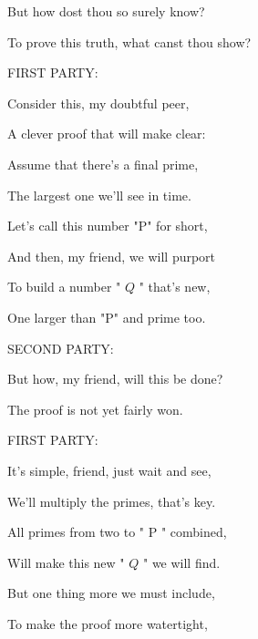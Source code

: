 \documentclass[10pt]{report}
\begin{document}
\hspace*{1em} But how dost thou so surely know?

\hspace*{1em} To prove this truth, what canst thou show?

\hspace*{1em} FIRST PARTY:

\hspace*{1em} Consider this, my doubtful peer,

\hspace*{1em} A clever proof that will make clear:

\hspace*{1em} Assume that there's a final prime,

\hspace*{1em} The largest one we'll see in time.

\hspace*{1em} Let's call this number "P" for short,

\hspace*{1em} And then, my friend, we will purport

\hspace*{1em} To build a number " \(Q\) " that's new,

\hspace*{1em} One larger than "P" and prime too.

\hspace*{1em} SECOND PARTY:

\hspace*{1em} But how, my friend, will this be done?

\hspace*{1em} The proof is not yet fairly won.

\hspace*{1em} FIRST PARTY:

\hspace*{1em} It's simple, friend, just wait and see,

\hspace*{1em} We'll multiply the primes, that's key.

\hspace*{1em} All primes from two to " \(\mathrm{P}\) " combined,

\hspace*{1em} Will make this new " \(Q\) " we will find.

\hspace*{1em} But one thing more we must include,

\hspace*{1em} To make the proof more watertight,
\end{document}
